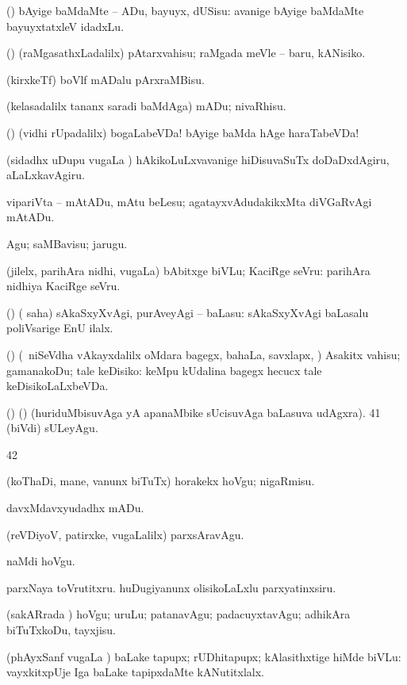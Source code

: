{{ (\AmA) bAyige baMdaMte -- ADu, bayuyx,
dUSisu:  avanige bAyige baMdaMte bayuyxtatxleV idadxLu.

 (\AmA) (raMgasathxLadalilx) pAtarxvahisu; raMgada meVle -- baru, kANisiko.

 (kirxkeTf) boVlf mADalu pArxraMBisu. 

 (kelasadalilx tananx
saradi baMdAga) mADu; nivaRhisu. 

 (\AmA) (vidhi rUpadalilx)
bogaLabeVDa! bAyige baMda hAge haraTabeVDa! 

 (sidadhx uDupu \mo vugaLa \vi) hAkikoLuLxvavanige
hiDisuvaSuTx doDaDxdAgiru, aLaLxkavAgiru.  
  
 vipariVta -- mAtADu, mAtu beLesu; agatayxvAdudakikxMta diVGaRvAgi mAtADu. 

 Agu; saMBavisu; jarugu. 

 (jilelx, parihAra nidhi, \mo vugaLa) bAbitxge biVLu; KaciRge seVru:  parihAra nidhiya KaciRge seVru. 

 (\AmA) ( saha)
sAkaSxyXvAgi, purAveyAgi -- baLasu:  sAkaSxyXvAgi baLasalu poliVsarige EnU ilalx.  

 (\AmA) (\kanmu\ niSeVdha vAkayxdalilx oMdara bagegx, bahaLa,
savxlapx, \mo) Asakitx vahisu; gamanakoDu; tale keDisiko: 
 keMpu kUdalina bagegx hecucx tale
keDisikoLaLxbeVDa.  

 (\AmA) () (huriduMbisuvAga yA apanaMbike sUcisuvAga
baLasuva udAgxra). 
\num{41}  (biVdi) sULeyAgu. 

\num{42}  

 (koThaDi, mane, \mo vanunx biTuTx) horakekx hoVgu; nigaRmisu.

 davxMdavxyudadhx mADu. 

 (reVDiyoV, patirxke, \mo vugaLalilx)
parxsAravAgu. 

 naMdi hoVgu. 

 parxNaya toVrutitxru. huDugiyanunx olisikoLaLxlu parxyatinxsiru. 

 (sakARrada \vi) hoVgu; uruLu; patanavAgu; padacuyxtavAgu; adhikAra biTuTxkoDu, tayxjisu. 

 (phAyxSanf \mo vugaLa \vi) baLake tapupx; rUDhitapupx;
kAlasithxtige hiMde biVLu: 
vayxkitxpUje Iga baLake tapipxdaMte kANutitxlalx. 

}}
